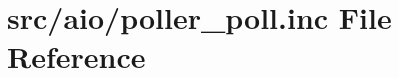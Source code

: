 \hypertarget{poller__poll_8inc}{}\section{src/aio/poller\+\_\+poll.inc File Reference}
\label{poller__poll_8inc}
